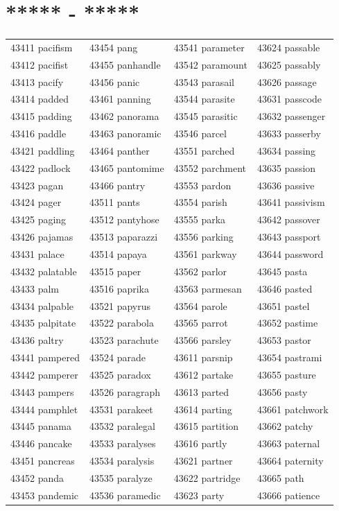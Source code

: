 \documentclass[10pt, oneside]{book}
\begin{document}
\begin{table}[h]
	\centering
	\section*{***** - *****}
	\begin{tabular}{l l l l}
43411 pacifism &43454 pang &43541 parameter &43624 passable\\
43412 pacifist &43455 panhandle &43542 paramount &43625 passably\\
43413 pacify &43456 panic &43543 parasail &43626 passage\\
43414 padded &43461 panning &43544 parasite &43631 passcode\\
43415 padding &43462 panorama &43545 parasitic &43632 passenger\\
43416 paddle &43463 panoramic &43546 parcel &43633 passerby\\
43421 paddling &43464 panther &43551 parched &43634 passing\\
43422 padlock &43465 pantomime &43552 parchment &43635 passion\\
43423 pagan &43466 pantry &43553 pardon &43636 passive\\
43424 pager &43511 pants &43554 parish &43641 passivism\\
43425 paging &43512 pantyhose &43555 parka &43642 passover\\
43426 pajamas &43513 paparazzi &43556 parking &43643 passport\\
43431 palace &43514 papaya &43561 parkway &43644 password\\
43432 palatable &43515 paper &43562 parlor &43645 pasta\\
43433 palm &43516 paprika &43563 parmesan &43646 pasted\\
43434 palpable &43521 papyrus &43564 parole &43651 pastel\\
43435 palpitate &43522 parabola &43565 parrot &43652 pastime\\
43436 paltry &43523 parachute &43566 parsley &43653 pastor\\
43441 pampered &43524 parade &43611 parsnip &43654 pastrami\\
43442 pamperer &43525 paradox &43612 partake &43655 pasture\\
43443 pampers &43526 paragraph &43613 parted &43656 pasty\\
43444 pamphlet &43531 parakeet &43614 parting &43661 patchwork\\
43445 panama &43532 paralegal &43615 partition &43662 patchy\\
43446 pancake &43533 paralyses &43616 partly &43663 paternal\\
43451 pancreas &43534 paralysis &43621 partner &43664 paternity\\
43452 panda &43535 paralyze &43622 partridge &43665 path\\
43453 pandemic &43536 paramedic &43623 party &43666 patience\\
	\end{tabular}
 \end{table}
\end{document}
